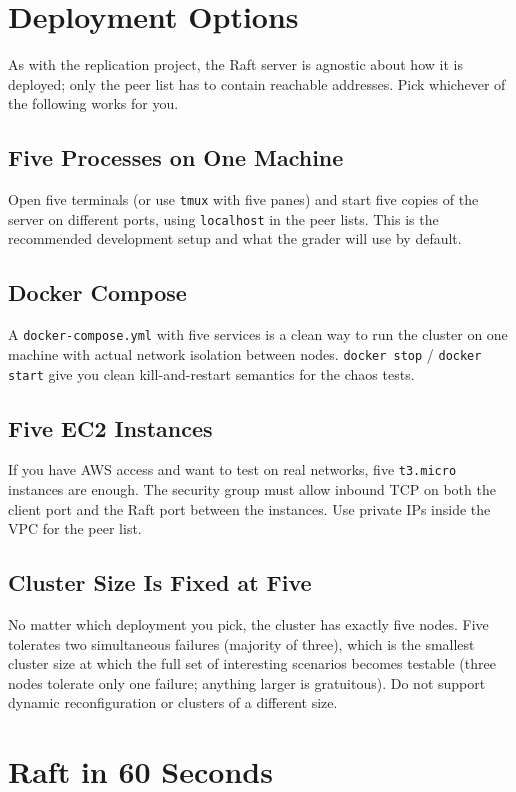 \documentclass[11pt,a4paper]{article}
\begin{document}
\section{Deployment Options}

As with the replication project, the Raft server is agnostic about how it is deployed; only the peer list has to contain reachable addresses. Pick whichever of the following works for you.

\subsection{Five Processes on One Machine}
Open five terminals (or use \texttt{tmux} with five panes) and start five copies of the server on different ports, using \texttt{localhost} in the peer lists. This is the recommended development setup and what the grader will use by default.

\subsection{Docker Compose}
A \texttt{docker-compose.yml} with five services is a clean way to run the cluster on one machine with actual network isolation between nodes. \texttt{docker stop} / \texttt{docker start} give you clean kill-and-restart semantics for the chaos tests.

\subsection{Five EC2 Instances}
If you have AWS access and want to test on real networks, five \texttt{t3.micro} instances are enough. The security group must allow inbound TCP on both the client port and the Raft port between the instances. Use private IPs inside the VPC for the peer list.

\subsection{Cluster Size Is Fixed at Five}
No matter which deployment you pick, the cluster has exactly five nodes. Five tolerates two simultaneous failures (majority of three), which is the smallest cluster size at which the full set of interesting scenarios becomes testable (three nodes tolerate only one failure; anything larger is gratuitous). Do not support dynamic reconfiguration or clusters of a different size.

\section{Raft in 60 Seconds}
\end{document}
